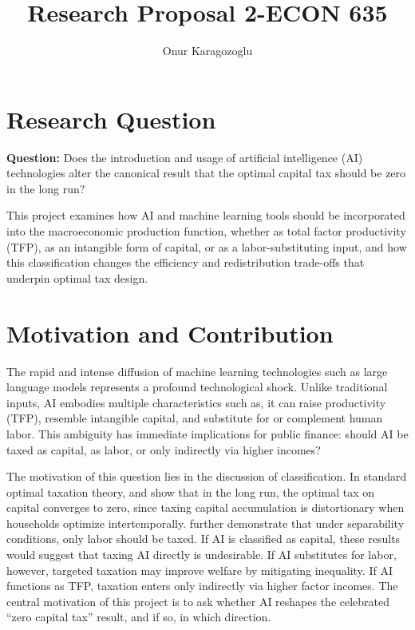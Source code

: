 

\title{Research Proposal 2-ECON 635}
\author{Onur Karagozoglu}
\date{}
\doublespacing



\maketitle

\section*{Research Question}

\textbf{Question:} Does the introduction and usage of artificial intelligence (AI) technologies alter the canonical result that the optimal capital tax should be zero in the long run?  

This project examines how AI and machine learning tools should be incorporated into the macroeconomic production function, whether as total factor productivity (TFP), as an intangible form of capital, or as a labor-substituting input, and how this classification changes the efficiency and redistribution trade-offs that underpin optimal tax design.

\section*{Motivation and Contribution}

The rapid and intense diffusion of machine learning technologies such as large language models represents a profound technological shock. Unlike traditional inputs, AI embodies multiple characteristics such as, it can raise productivity (TFP), resemble intangible capital, and substitute for or complement human labor. This ambiguity has immediate implications for public finance: should AI be taxed as capital, as labor, or only indirectly via higher incomes?  

The motivation of this question lies in the discussion of classification. In standard optimal taxation theory, \citet{Chamley1986} and \citet{Judd1985} show that in the long run, the optimal tax on capital converges to zero, since taxing capital accumulation is distortionary when households optimize intertemporally. \citet{AtkinsonStiglitz1976} further demonstrate that under separability conditions, only labor should be taxed. If AI is classified as capital, these results would suggest that taxing AI directly is undesirable. If AI substitutes for labor, however, targeted taxation may improve welfare by mitigating inequality. If AI functions as TFP, taxation enters only indirectly via higher factor incomes. The central motivation of this project is to ask whether AI reshapes the celebrated ``zero capital tax'' result, and if so, in which direction.  

